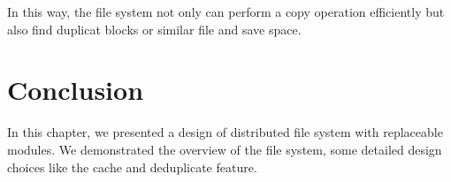     In this way, the file system not only can perform a copy operation efficiently but also find duplicat blocks or similar file and save space. 

\section{Conclusion}

    In this chapter, we presented a design of distributed file system with replaceable modules. We demonstrated the overview of the file system, some detailed design choices like the cache and deduplicate feature.
